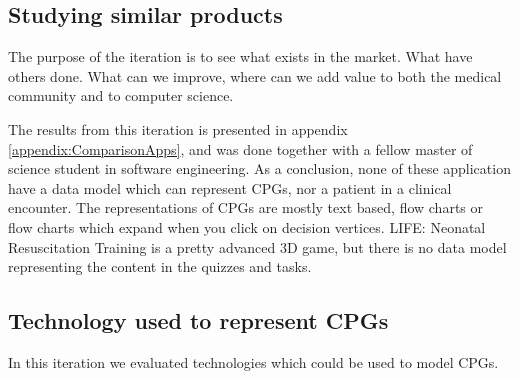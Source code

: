 \subsection{Studying similar products}
The purpose of the iteration is to see what exists in the market. What have others done. What can we improve, where can we add value to both the medical community and to computer science.

The results from this iteration is presented in appendix \ref{appendix:ComparisonApps}, and was done together with a fellow master of science student in software engineering. As a conclusion, none of these application have a data model which can represent CPGs, nor a patient in a clinical encounter. The representations of CPGs are mostly text based, flow charts or flow charts which expand when you click on decision vertices. LIFE: Neonatal Resuscitation Training is a pretty advanced 3D game, but there is no data model representing the content in the quizzes and tasks.

\subsection{Technology used to represent CPGs}
In this iteration we evaluated technologies which could be used to model CPGs.


